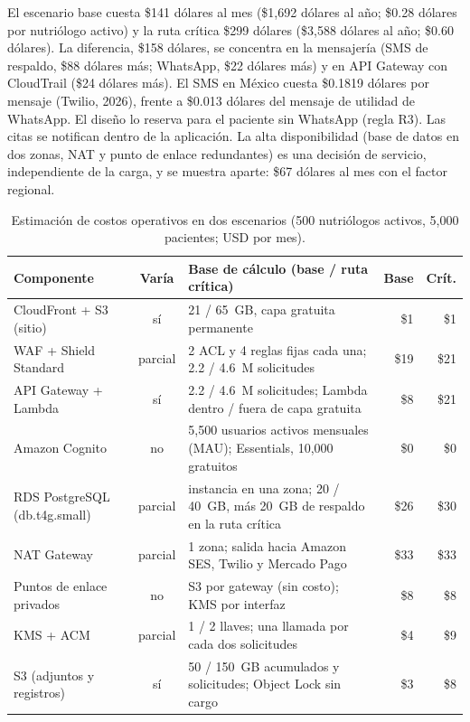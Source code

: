 \documentclass[12pt, a4paper]{article}
\begin{document}
El escenario base cuesta \$141 dólares al mes (\$1,692 dólares al año;
\$0.28 dólares por nutriólogo activo) y la ruta crítica \$299 dólares
(\$3,588 dólares al año; \$0.60 dólares). La diferencia, \$158 dólares,
se concentra en la mensajería (SMS de respaldo, \$88 dólares más;
WhatsApp, \$22 dólares más) y en API Gateway con CloudTrail (\$24
dólares más). El SMS en México cuesta \$0.1819 dólares por mensaje
(Twilio, 2026), frente a \$0.013 dólares del mensaje de utilidad de
WhatsApp. El diseño lo reserva para el paciente sin WhatsApp
(regla R3). Las citas se notifican
dentro de la aplicación. La alta disponibilidad (base de datos en dos
zonas, NAT y punto de enlace redundantes) es una decisión de servicio,
independiente de la carga, y se muestra aparte: \$67 dólares al
mes con el factor regional.
 
\begin{table}[!ht]
  \centering
  \caption{Estimación de costos operativos en dos escenarios (500 nutriólogos
  activos, 5,000 pacientes; USD por mes).}
  \label{tab:costos}
  \scriptsize
  \setlength{\tabcolsep}{3pt}
  \renewcommand{\arraystretch}{1.05}
  \begin{tabularx}{\textwidth}{p{3.4cm} c X r r}
    \toprule
    \textbf{Componente} & \textbf{Varía} & \textbf{Base de cálculo (base / ruta crítica)} & \textbf{Base} & \textbf{Crít.} \\
    \midrule
    CloudFront + S3 (sitio) & sí & 21 / 65~GB, capa gratuita permanente & \$1 & \$1 \\
    WAF + Shield Standard & parcial & 2 ACL y 4 reglas fijas cada una; 2.2 / 4.6~M solicitudes & \$19 & \$21 \\
    API Gateway + Lambda & sí & 2.2 / 4.6~M solicitudes; Lambda dentro / fuera de capa gratuita & \$8 & \$21 \\
    Amazon Cognito & no & 5,500 usuarios activos mensuales (MAU); Essentials, 10,000 gratuitos & \$0 & \$0 \\
    RDS PostgreSQL (db.t4g.small) & parcial & instancia en una zona; 20 / 40~GB, más 20~GB de respaldo en la ruta crítica & \$26 & \$30 \\
    NAT Gateway & parcial & 1 zona; salida hacia Amazon SES, Twilio y Mercado Pago & \$33 & \$33 \\
    Puntos de enlace privados & no & S3 por gateway (sin costo); KMS por interfaz & \$8 & \$8 \\
    KMS + ACM & parcial & 1 / 2 llaves; una llamada por cada dos solicitudes & \$4 & \$9 \\
    S3 (adjuntos y registros) & sí & 50 / 150~GB acumulados y solicitudes; Object Lock sin cargo & \$3 & \$8 \\

\end{tabularx}
\end{table}
\end{document}
